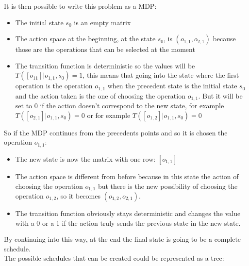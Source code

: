 \documentclass[12pt]{book}
\begin{document}
It is then possible to write this problem as a MDP:
\begin{itemize}
    \item The initial state $s_0$ is an empty matrix %
    \item The action space at the beginning, at the state $s_0$, is $(o_{1,1}, o_{2,1})$ because those are the operations that can be selected at the moment%
\item The transition function is deterministic so the values will be $T([o_{11}]|o_{1,1}, s_0)=1$, this means that going into the state where the first operation is the operation $o_{1,1}$ when the precedent state is the initial state $s_0$ and the action taken is the one of choosing the operation $o_{1,1}$. But it will be set to 0 if the action doesn't correspond to the new state, for example $T([o_{2,1}]|o_{1,1}, s_0)=0$ or for example $T([o_{1,2}]|o_{1,1}, s_0)=0$
\end{itemize}

So if the MDP continues from the precedents points and so it is chosen the operation $o_{1,1}$:
\begin{itemize}
    \item The new state is now the matrix with one row: $[o_{1,1}]$
    \item The action space is different from before because in this state the action of choosing the operation $o_{1,1}$ but there is the new possibility of choosing the operation $o_{1,2}$, so it becomes $(o_{1,2}, o_{2,1})$.
    \item The transition function obviously stays deterministic and changes the value with a 0 or a 1 if the action truly sends the previous state in the new state.
\end{itemize}

By continuing into this way, at the end the final state is going to be a complete schedule.\\
The possible schedules that can be created could be represented as a tree:
\end{document}
